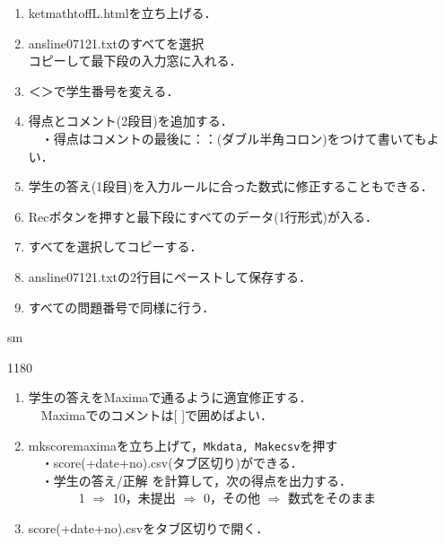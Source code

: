 \documentclass[landscape,10pt]{ujarticle}
\newcommand{\slidepage}[1][s]{%
\setcounter{ketpicctra}{18}%
\if#1m \setcounter{ketpicctra}{1}\fi
\hypersetup{linkcolor=black}%

\begin{layer}{118}{0}
\putnotee{122}{-\theketpicctra.05}{\small\thepage/\pageref{pageend}}
\end{layer}\hypersetup{linkcolor=blue}

}
\begin{document}
\begin{enumerate}[(1)]
\item
ketmathtoffL.htmlを立ち上げる．\vspace{-2mm}
\item
ansline07121.txtのすべてを選択\\
コピーして最下段の入力窓に入れる．\vspace{-2mm}\\
\item
＜＞で学生番号を変える．\vspace{-2mm}
\item
得点とコメント(2段目)を追加する．\\
　・得点はコメントの最後に：\hspace{-2mm}：(ダブル半角コロン)をつけて書いてもよい．\vspace{-2mm}
\item
学生の答え(1段目)を入力ルールに合った数式に修正することもできる．\vspace{-2mm}
\item
Recボタンを押すと最下段にすべてのデータ(1行形式)が入る．\vspace{-2mm}
\item
すべてを選択してコピーする．\vspace{-2mm}
\item
ansline07121.txtの2行目にペーストして保存する．\vspace{-2mm}
\item
すべての問題番号で同様に行う．
\end{enumerate}


\vspace*{18mm}

\slidepage
\begin{enumerate}[(1)]
\item
学生の答えをMaximaで通るように適宜修正する．\\
　Maximaでのコメントは[ ]で囲めばよい．
\item
mkscoremaximaを立ち上げて，\verb|Mkdata, Makecsv|を押す\\
　・score(+date+no).csv(タブ区切り)ができる．\\
　・学生の答え/正解 を計算して，次の得点を出力する．\\
　　　　1 $\Longrightarrow$ 10，未提出 $\Longrightarrow$ 0，その他 $\Longrightarrow$ 数式をそのまま
\item
score(+date+no).csvをタブ区切りで開く．
\end{enumerate}
\end{document}
